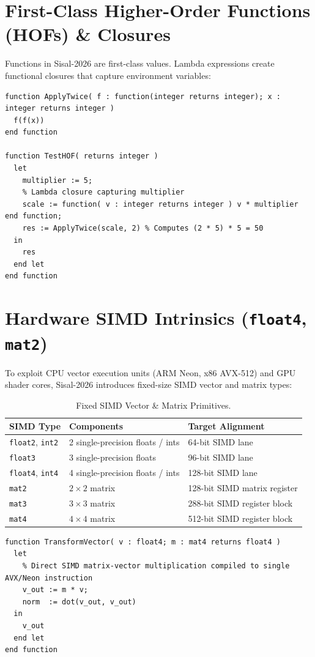\section{First-Class Higher-Order Functions (HOFs) \& Closures}
Functions in Sisal-2026 are first-class values. Lambda expressions create functional closures that capture environment variables:

\begin{lstlisting}[caption={Higher-Order Function \& Closure Usage}]
function ApplyTwice( f : function(integer returns integer); x : integer returns integer )
  f(f(x))
end function

function TestHOF( returns integer )
  let
    multiplier := 5;
    % Lambda closure capturing multiplier
    scale := function( v : integer returns integer ) v * multiplier end function;
    res := ApplyTwice(scale, 2) % Computes (2 * 5) * 5 = 50
  in
    res
  end let
end function
\end{lstlisting}

\section{Hardware SIMD Intrinsics (\texttt{float4}, \texttt{mat2})}
To exploit CPU vector execution units (ARM Neon, x86 AVX-512) and GPU shader cores, Sisal-2026 introduces fixed-size SIMD vector and matrix types:

\begin{table}[h!]
\centering
\begin{tabular}{lll}
\toprule
\textbf{SIMD Type} & \textbf{Components} & \textbf{Target Alignment} \\
\midrule
\texttt{float2}, \texttt{int2} & 2 single-precision floats / ints & 64-bit SIMD lane \\
\texttt{float3} & 3 single-precision floats & 96-bit SIMD lane \\
\texttt{float4}, \texttt{int4} & 4 single-precision floats / ints & 128-bit SIMD lane \\
\texttt{mat2} & $2 \times 2$ matrix & 128-bit SIMD matrix register \\
\texttt{mat3} & $3 \times 3$ matrix & 288-bit SIMD register block \\
\texttt{mat4} & $4 \times 4$ matrix & 512-bit SIMD register block \\
\bottomrule
\end{tabular}
\caption{Fixed SIMD Vector \& Matrix Primitives.}
\label{tab:simd_types}
\end{table}

\begin{lstlisting}[caption={SIMD Math Intrinsics Example}]
function TransformVector( v : float4; m : mat4 returns float4 )
  let
    % Direct SIMD matrix-vector multiplication compiled to single AVX/Neon instruction
    v_out := m * v;
    norm  := dot(v_out, v_out)
  in
    v_out
  end let
end function
\end{lstlisting}
